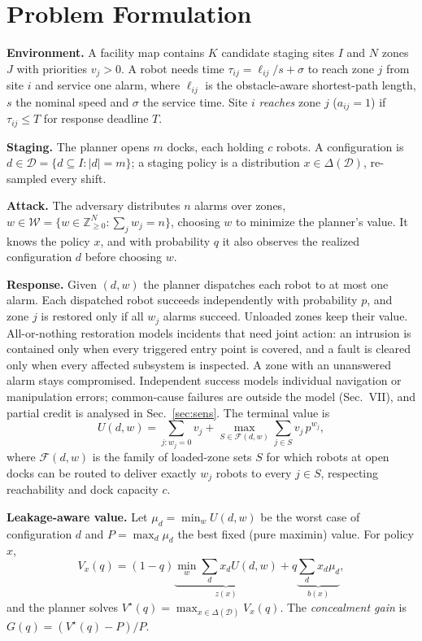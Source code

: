 \documentclass[letterpaper,journal]{IEEEtran}
\theoremstyle{remark}
\newcommand{\D}{\mathcal{D}}
\newcommand{\W}{\mathcal{W}}
\begin{document}
\section{Problem Formulation}\label{sec:model}
\textbf{Environment.} A facility map contains $K$ candidate staging sites $I$ and $N$ zones $J$ with priorities $v_j>0$. A robot needs time $\tau_{ij}=\ell_{ij}/s+\sigma$ to reach zone $j$ from site $i$ and service one alarm, where $\ell_{ij}$ is the obstacle-aware shortest-path length, $s$ the nominal speed and $\sigma$ the service time. Site $i$ \emph{reaches} zone $j$ ($a_{ij}=1$) if $\tau_{ij}\le T$ for response deadline $T$.

\textbf{Staging.} The planner opens $m$ docks, each holding $c$ robots. A configuration is $d\in\D=\{d\subseteq I:|d|=m\}$; a staging policy is a distribution $x\in\Delta(\D)$, re-sampled every shift.

\textbf{Attack.} The adversary distributes $n$ alarms over zones, $w\in\W=\{w\in\mathbb{Z}^N_{\ge0}:\sum_j w_j=n\}$, choosing $w$ to minimize the planner's value. It knows the policy $x$, and with probability $q$ it also observes the realized configuration $d$ before choosing $w$.

\textbf{Response.} Given $(d,w)$ the planner dispatches each robot to at most one alarm. Each dispatched robot succeeds independently with probability $p$, and zone $j$ is restored only if all $w_j$ alarms succeed. Unloaded zones keep their value. All-or-nothing restoration models incidents that need joint action: an intrusion is contained only when every triggered entry point is covered, and a fault is cleared only when every affected subsystem is inspected. A zone with an unanswered alarm stays compromised. Independent success models individual navigation or manipulation errors; common-cause failures are outside the model (Sec.~VII), and partial credit is analysed in Sec.~\ref{sec:sens}. The terminal value is
\begin{equation}\label{eq:U}
U(d,w)=\sum_{j:w_j=0}v_j+\max_{S\in\mathcal{F}(d,w)}\sum_{j\in S}v_j\,p^{w_j},
\end{equation}
where $\mathcal{F}(d,w)$ is the family of loaded-zone sets $S$ for which robots at open docks can be routed to deliver exactly $w_j$ robots to every $j\in S$, respecting reachability and dock capacity $c$.

\textbf{Leakage-aware value.} Let $\mu_d=\min_{w}U(d,w)$ be the worst case of configuration $d$ and $P=\max_d \mu_d$ the best fixed (pure maximin) value. For policy $x$,
\begin{equation}\label{eq:Vx}
V_x(q)=(1-q)\underbrace{\min_{w}\sum_{d}x_dU(d,w)}_{z(x)}+q\underbrace{\sum_d x_d\mu_d}_{b(x)},
\end{equation}
and the planner solves $V^\star(q)=\max_{x\in\Delta(\D)}V_x(q)$. The \emph{concealment gain} is $G(q)=(V^\star(q)-P)/P$.
\end{document}
